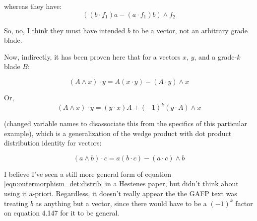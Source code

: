 whereas they have:
\begin{equation*}
\left( (b \cdot f_1) a - (a \cdot f_1) b \right) \wedge f_2
\end{equation*}

So, no, I think they must have intended $b$ to be a vector, not an
arbitrary grade blade.

Now, indirectly, it has been 
proven here that for a vectors $x$, $y$, and a grade-$k$ blade $B$:

\begin{equation}\label{eqn:outermorphism_det:distrib}
(A \wedge x) \cdot y = A ( x \cdot y ) - ( A \cdot y ) \wedge x
\end{equation}

Or,
\begin{equation}
(A \wedge x) \cdot y = ( y \cdot x ) A + (-1)^{k}( y \cdot A ) \wedge x
\end{equation}

(changed variable names to disassociate this from the specifics of this 
particular example), which is a generalization of the wedge product with 
dot product distribution identity for vectors:

\begin{equation}
(a \wedge b) \cdot c = a ( b \cdot c ) - ( a \cdot c ) \wedge b
\end{equation}

I believe I've seen a still more general form of equation \ref{eqn:outermorphism_det:distrib}
in a
Hestenes paper, but didn't think about using it a-priori.  Regardless, it
doesn't really appear the the GAFP text was treating $b$ as anything but a
vector, since there would have to be a $(-1)^k$ factor on equation 4.147 for
it to be general.
